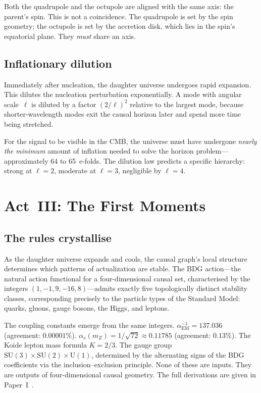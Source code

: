\documentclass[11pt,a4paper]{article}
\theoremstyle{plain}
\theoremstyle{definition}
\theoremstyle{remark}
\begin{document}
Both the quadrupole and the octupole are aligned with the same axis: the
parent's spin.  This is not a coincidence.  The quadrupole is set by the
spin geometry; the octupole is set by the accretion disk, which lies in
the spin's equatorial plane.  They \emph{must} share an axis.

\subsection{Inflationary dilution}\label{sec:inflation}

Immediately after nucleation, the daughter universe undergoes rapid
expansion.  This dilutes the nucleation perturbation exponentially.  A
mode with angular scale~$\ell$ is diluted by a factor $(2/\ell)^2$
relative to the largest mode, because shorter-wavelength modes exit the
causal horizon later and spend more time being stretched.

For the signal to be visible in the CMB, the universe must have undergone
\emph{nearly the minimum} amount of inflation needed to solve the horizon
problem---approximately 64 to 65~e-folds.  The dilution law predicts a
specific hierarchy: strong at $\ell = 2$, moderate at $\ell = 3$,
negligible by $\ell = 4$.

\section{Act~III: The First Moments}\label{sec:act3}

\subsection{The rules crystallise}\label{sec:rules}

As the daughter universe expands and cools, the causal graph's local
structure determines which patterns of actualization are stable.  The BDG
action---the natural action functional for a four-dimensional causal set,
characterised by the integers $(1,-1,9,-16,8)$---admits exactly five
topologically distinct stability classes, corresponding precisely to the
particle types of the Standard Model: quarks, gluons, gauge bosons, the
Higgs, and leptons.

The coupling constants emerge from the same integers.
$\alpha_{\mathrm{EM}}^{-1} = 137.036$ (agreement: $0.00001\%$).
$\alpha_s(m_Z) = 1/\sqrt{72} \approx 0.11785$ (agreement: $0.13\%$).
The Koide lepton mass formula $K = 2/3$.  The gauge group
$\mathrm{SU}(3)\times\mathrm{SU}(2)\times\mathrm{U}(1)$, determined by
the alternating signs of the BDG coefficients via the
inclusion--exclusion principle.  None of these are inputs.  They are
outputs of four-dimensional causal geometry.  The full derivations are
given in Paper~I~\cite{P1}.
\end{document}
